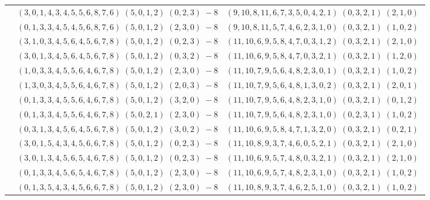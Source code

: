 \documentclass[11pt]{article}
\begin{document}
\begin{longtable}[l]{|c|c|c|}
 \cline{2-3} 
 & $(3 ,0 ,1 ,4 ,3 ,4 ,5 ,5 ,6 ,8 ,7 ,6) \;(5 ,0 ,1 ,2) \;(0 ,2 ,3) \;-8$ & $(9 ,10 ,8 ,11 ,6 ,7 ,3 ,5 ,0 ,4 ,2 ,1) \;(0 ,3 ,2 ,1) \;(2 ,1 ,0) \;$\\ 
 \cline{2-3} 
 & $(0 ,1 ,3 ,3 ,4 ,5 ,4 ,5 ,6 ,8 ,7 ,6) \;(5 ,0 ,1 ,2) \;(2 ,3 ,0) \;-8$ & $(9 ,10 ,8 ,11 ,5 ,7 ,4 ,6 ,2 ,3 ,1 ,0) \;(0 ,3 ,2 ,1) \;(1 ,0 ,2) \;$\\ 
 \cline{2-3} 
 & $(3 ,1 ,0 ,3 ,4 ,5 ,6 ,4 ,5 ,6 ,7 ,8) \;(5 ,0 ,1 ,2) \;(0 ,2 ,3) \;-8$ & $(11 ,10 ,6 ,9 ,5 ,8 ,4 ,7 ,0 ,3 ,1 ,2) \;(0 ,3 ,2 ,1) \;(2 ,1 ,0) \;$\\ 
 \cline{2-3} 
 & $(3 ,0 ,1 ,3 ,4 ,5 ,6 ,4 ,5 ,6 ,7 ,8) \;(5 ,0 ,1 ,2) \;(0 ,3 ,2) \;-8$ & $(11 ,10 ,6 ,9 ,5 ,8 ,4 ,7 ,0 ,3 ,2 ,1) \;(0 ,3 ,2 ,1) \;(1 ,2 ,0) \;$\\ 
 \cline{2-3} 
 & $(1 ,0 ,3 ,3 ,4 ,5 ,5 ,6 ,4 ,6 ,7 ,8) \;(5 ,0 ,1 ,2) \;(2 ,3 ,0) \;-8$ & $(11 ,10 ,7 ,9 ,5 ,6 ,4 ,8 ,2 ,3 ,0 ,1) \;(0 ,3 ,2 ,1) \;(1 ,0 ,2) \;$\\ 
 \cline{2-3} 
 & $(1 ,3 ,0 ,3 ,4 ,5 ,5 ,6 ,4 ,6 ,7 ,8) \;(5 ,0 ,1 ,2) \;(2 ,0 ,3) \;-8$ & $(11 ,10 ,7 ,9 ,5 ,6 ,4 ,8 ,1 ,3 ,0 ,2) \;(0 ,3 ,2 ,1) \;(2 ,0 ,1) \;$\\ 
 \cline{2-3} 
 & $(0 ,1 ,3 ,3 ,4 ,5 ,5 ,6 ,4 ,6 ,7 ,8) \;(5 ,0 ,1 ,2) \;(3 ,2 ,0) \;-8$ & $(11 ,10 ,7 ,9 ,5 ,6 ,4 ,8 ,2 ,3 ,1 ,0) \;(0 ,3 ,2 ,1) \;(0 ,1 ,2) \;$\\ 
 \cline{2-3} 
 & $(0 ,1 ,3 ,3 ,4 ,5 ,5 ,6 ,4 ,6 ,7 ,8) \;(5 ,0 ,2 ,1) \;(2 ,3 ,0) \;-8$ & $(11 ,10 ,7 ,9 ,5 ,6 ,4 ,8 ,2 ,3 ,1 ,0) \;(0 ,2 ,3 ,1) \;(1 ,0 ,2) \;$\\ 
 \cline{2-3} 
 & $(0 ,3 ,1 ,3 ,4 ,5 ,6 ,4 ,5 ,6 ,7 ,8) \;(5 ,0 ,1 ,2) \;(3 ,0 ,2) \;-8$ & $(11 ,10 ,6 ,9 ,5 ,8 ,4 ,7 ,1 ,3 ,2 ,0) \;(0 ,3 ,2 ,1) \;(0 ,2 ,1) \;$\\ 
 \cline{2-3} 
 & $(3 ,0 ,1 ,5 ,4 ,3 ,4 ,5 ,6 ,6 ,7 ,8) \;(5 ,0 ,1 ,2) \;(0 ,2 ,3) \;-8$ & $(11 ,10 ,8 ,9 ,3 ,7 ,4 ,6 ,0 ,5 ,2 ,1) \;(0 ,3 ,2 ,1) \;(2 ,1 ,0) \;$\\ 
 \cline{2-3} 
 & $(3 ,0 ,1 ,3 ,4 ,5 ,6 ,5 ,4 ,6 ,7 ,8) \;(5 ,0 ,1 ,2) \;(0 ,2 ,3) \;-8$ & $(11 ,10 ,6 ,9 ,5 ,7 ,4 ,8 ,0 ,3 ,2 ,1) \;(0 ,3 ,2 ,1) \;(2 ,1 ,0) \;$\\ 
 \cline{2-3} 
 & $(0 ,1 ,3 ,3 ,4 ,5 ,6 ,5 ,4 ,6 ,7 ,8) \;(5 ,0 ,1 ,2) \;(2 ,3 ,0) \;-8$ & $(11 ,10 ,6 ,9 ,5 ,7 ,4 ,8 ,2 ,3 ,1 ,0) \;(0 ,3 ,2 ,1) \;(1 ,0 ,2) \;$\\ 
 \cline{2-3} 
 & $(0 ,1 ,3 ,5 ,4 ,3 ,4 ,5 ,6 ,6 ,7 ,8) \;(5 ,0 ,1 ,2) \;(2 ,3 ,0) \;-8$ & $(11 ,10 ,8 ,9 ,3 ,7 ,4 ,6 ,2 ,5 ,1 ,0) \;(0 ,3 ,2 ,1) \;(1 ,0 ,2) \;$\\ 

\end{longtable}
\end{document}
